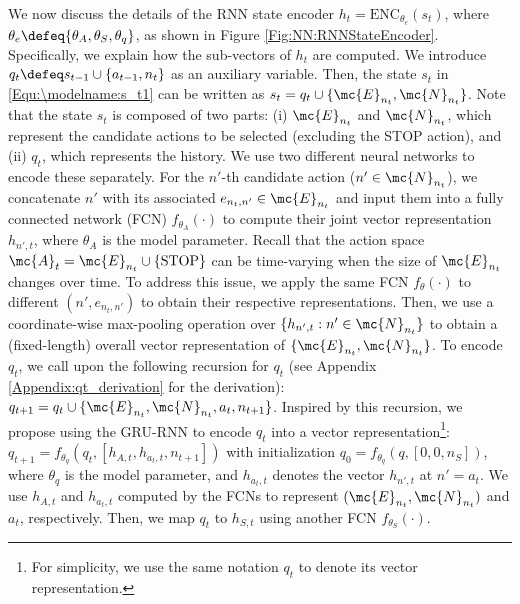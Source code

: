 \documentclass{article}
\begin{document}
	We now discuss the details of the RNN state encoder $h_t = \mathrm{ENC}_{\theta_e}(s_t)$, where $\theta_e \defeq \{\theta_A,\theta_S,\theta_q\}$, as shown in Figure \ref{Fig:NN:RNNStateEncoder}. Specifically, we explain how the sub-vectors of $h_t$ are computed. We introduce $q_t \defeq s_{t-1} \cup \{a_{t-1}, n_t\}$ as an auxiliary variable. Then, the state $s_t$ in \eqref{Equ:\modelname:s_t1} can be written as $s_t = q_t \cup \{\mc{E}_{n_t}, \mc{N}_{n_t}\}$. Note that the state $s_t$ is composed of two parts: (i) $\mc{E}_{n_t}$ and $\mc{N}_{n_t}$, which represent the candidate actions to be selected (excluding the STOP action), and (ii) $q_t$, which represents the history. We use two different neural networks to encode these separately. For the $n'$-th candidate action ($n' \in \mc{N}_{n_t}$), we concatenate $n'$ with its associated $e_{n_t,n'} \in \mc{E}_{n_t}$ and input them into a fully connected network (FCN) $f_{\theta_A}(\cdot)$ to compute their joint vector representation $h_{n',t}$, where $\theta_A$ is the model parameter. Recall that the action space $\mc{A}_t = \mc{E}_{n_t} \cup \{\mathrm{STOP}\}$ can be time-varying when the size of $\mc{E}_{n_t}$ changes over time. To address this issue, we apply the same FCN $f_{\theta}(\cdot)$ to different $(n',e_{n_t,n'})$ to obtain their respective representations. Then, we use a coordinate-wise max-pooling operation over $\{h_{n',t}: n' \in \mc{N}_{n_t}\}$ to obtain a (fixed-length) overall vector representation of $\{\mc{E}_{n_t}, \mc{N}_{n_t}\}$. To encode $q_t$, we call upon the following recursion for $q_t$ (see Appendix \ref{Appendix:qt_derivation} for the derivation): $q_{t+1} = q_t \cup \{ \mc{E}_{n_t}, \mc{N}_{n_t}, a_t, n_{t+1} \}$. Inspired by this recursion, we propose using the GRU-RNN \cite{cho2014learning} to encode $q_t$ into a vector representation\footnote{For simplicity, we use the same notation $q_t$ to denote its vector representation.}: $q_{t+1}=f_{\theta_q}(q_{t}, [h_{A,t}, h_{a_{t},t}, n_{t+1}])$ with initialization $q_0=f_{\theta_q}(q,[0,0,n_S])$, where $\theta_q$ is the model parameter, and $h_{a_t,t}$ denotes the vector $h_{n',t}$ at $n'=a_t$. We use $h_{A,t}$ and $h_{a_t,t}$ computed by the FCNs to represent $(\mc{E}_{n_t},\mc{N}_{n_t})$ and $a_t$, respectively. Then, we map $q_t$ to $h_{S,t}$ using another FCN $f_{\theta_S}(\cdot)$. 
	
	
	
	
	
\end{document}
